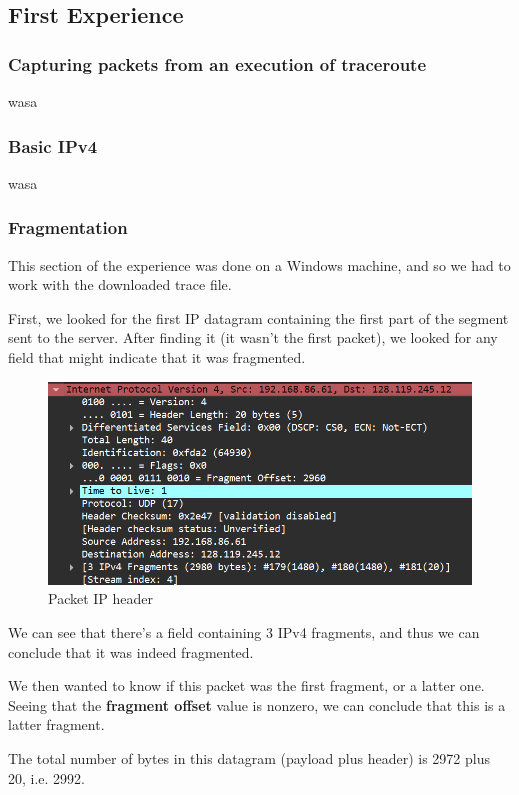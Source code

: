 \subsection{First Experience}

\subsubsection{Capturing packets from an execution of traceroute}
wasa

\subsubsection{Basic IPv4}
wasa

\subsubsection{Fragmentation}

This section of the experience was done on a Windows machine, and so we had to
work with the downloaded trace file.

First, we looked for the first IP datagram containing the first part of the
segment sent to the server. After finding it (it wasn't the first packet), we
looked for any field that might indicate that it was fragmented.

\begin{figure}[htbp]
    \centering
    \includegraphics[width=1\linewidth]{img/2/1.png}
    \caption{Packet IP header}\label{fig:2_1}
\end{figure}

We can see that there's a field containing 3 IPv4 fragments, and thus we can
conclude that it was indeed fragmented.

We then wanted to know if this packet was the first fragment, or a latter one.
Seeing that the \textbf{fragment offset} value is nonzero, we can conclude that
this is a latter fragment.

The total number of bytes in this datagram (payload plus header) is 2972 plus
20, i.e. 2992.